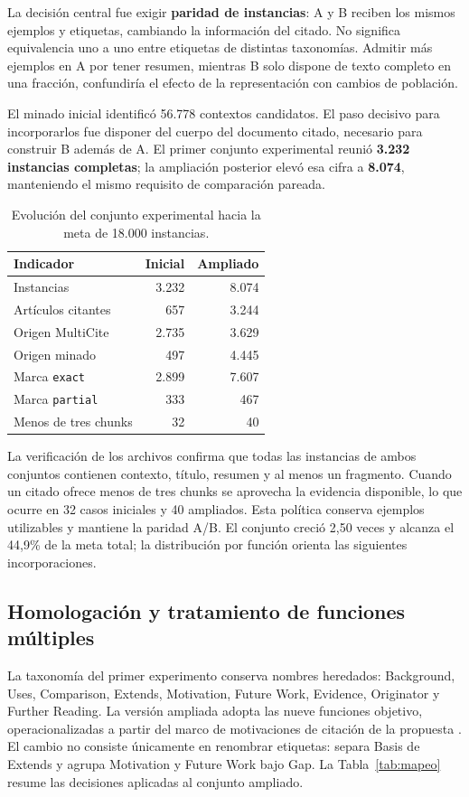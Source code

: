 \documentclass[10pt,a4paper,twocolumn]{article}
\begin{document}
La decisión central fue exigir \textbf{paridad de instancias}: A y B reciben los mismos ejemplos y etiquetas, cambiando la información del citado. No significa equivalencia uno a uno entre etiquetas de distintas taxonomías. Admitir más ejemplos en A por tener resumen, mientras B solo dispone de texto completo en una fracción, confundiría el efecto de la representación con cambios de población.

El minado inicial identificó 56.778 contextos candidatos. El paso decisivo para incorporarlos fue disponer del cuerpo del documento citado, necesario para construir B además de A. El primer conjunto experimental reunió \textbf{3.232 instancias completas}; la ampliación posterior elevó esa cifra a \textbf{8.074}, manteniendo el mismo requisito de comparación pareada.

\begin{table}[t]
\centering\small
\caption{Evolución del conjunto experimental hacia la meta de 18.000 instancias.}\label{tab:evolucion}
\begin{tabular}{lrr}\toprule
Indicador & Inicial & Ampliado\\\midrule
Instancias & 3.232 & 8.074\\
Artículos citantes & 657 & 3.244\\
Origen MultiCite & 2.735 & 3.629\\
Origen minado & 497 & 4.445\\
Marca \texttt{exact} & 2.899 & 7.607\\
Marca \texttt{partial} & 333 & 467\\
Menos de tres chunks & 32 & 40\\\bottomrule
\end{tabular}
\end{table}

La verificación de los archivos confirma que todas las instancias de ambos conjuntos contienen contexto, título, resumen y al menos un fragmento. Cuando un citado ofrece menos de tres chunks se aprovecha la evidencia disponible, lo que ocurre en 32 casos iniciales y 40 ampliados. Esta política conserva ejemplos utilizables y mantiene la paridad A/B. El conjunto creció 2,50 veces y alcanza el 44,9\% de la meta total; la distribución por función orienta las siguientes incorporaciones.

\subsection{Homologación y tratamiento de funciones múltiples}
La taxonomía del primer experimento conserva nombres heredados: Background, Uses, Comparison, Extends, Motivation, Future Work, Evidence, Originator y Further Reading. La versión ampliada adopta las nueve funciones objetivo, operacionalizadas a partir del marco de motivaciones de citación de la propuesta \cite{lyu}. El cambio no consiste únicamente en renombrar etiquetas: separa Basis de Extends y agrupa Motivation y Future Work bajo Gap. La Tabla~\ref{tab:mapeo} resume las decisiones aplicadas al conjunto ampliado.
\end{document}
